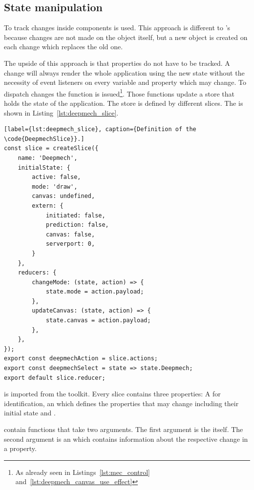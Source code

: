 \subsection{State manipulation}\label{ch:state_manipulation}

To track changes inside components \cite{Abramov2021} is used.
This approach is different to 's because changes are not made on the object itself, but a new object is created on each change which replaces the old one.


The upside of this approach is that properties do not have to be tracked.
A change will always render the whole application using the new state without the necessity of event listeners on every variable and property which may change.
To dispatch changes the  function is issued\footnote{As already seen in Listings~\ref{lst:mec_control} and~\ref{lst:deepmech_canvas_use_effect}}.
Those functions update a store that holds the state of the application.
The store is defined by different slices.
The  is shown in Listing~\ref{lst:deepmech_slice}.

\begin{lstlisting}[label={lst:deepmech_slice}, caption={Definition of the \code{DeepmechSlice}}.]
const slice = createSlice({
    name: 'Deepmech',
    initialState: {
        active: false,
        mode: 'draw',
        canvas: undefined,
        extern: {
            initiated: false,
            prediction: false,
            canvas: false,
            serverport: 0,
        }
    },
    reducers: {
        changeMode: (state, action) => {
            state.mode = action.payload;
        },
        updateCanvas: (state, action) => {
            state.canvas = action.payload;
        },
    },
});
export const deepmechAction = slice.actions;
export const deepmechSelect = state => state.Deepmech;
export default slice.reducer;
\end{lstlisting}

 is imported from the  toolkit.
Every slice contains three properties: A  for identification, an  which defines the properties that may change including their initial state and .

 contain functions that take two arguments.
The first argument is the  itself.
The second argument is an  which contains information about the respective change in a  property.

